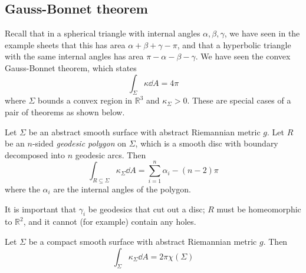 \subsection{Gauss-Bonnet theorem}
Recall that in a spherical triangle with internal angles \( \alpha, \beta, \gamma \), we have seen in the example sheets that this has area \( \alpha + \beta + \gamma - \pi \), and that a hyperbolic triangle with the same internal angles has area \( \pi - \alpha - \beta - \gamma \).
We have seen the convex Gauss-Bonnet theorem, which states
\[
	\int_\Sigma \kappa \dd{A} = 4\pi
\]
where \( \Sigma \) bounds a convex region in \( \mathbb R^3 \) and \( \kappa_\Sigma > 0 \).
These are special cases of a pair of theorems as shown below.
\begin{theorem}
	Let \( \Sigma \) be an abstract smooth surface with abstract Riemannian metric \( g \).
	Let \( R \) be an \( n \)-sided \textit{geodesic polygon} on \( \Sigma \), which is a smooth disc with boundary decomposed into \( n \) geodesic arcs.
	Then
	\[
		\int_{R \subseteq \Sigma} \kappa_\Sigma \dd{A} = \sum_{i=1}^n \alpha_i - (n-2)\pi
	\]
	where the \( \alpha_i \) are the internal angles of the polygon.
\end{theorem}
It is important that \( \gamma_i \) be geodesics that cut out a disc; \( R \) must be homeomorphic to \( \mathbb R^2 \), and it cannot (for example) contain any holes.
\begin{theorem}
	Let \( \Sigma \) be a compact smooth surface with abstract Riemannian metric \( g \).
	Then
	\[
		\int_\Sigma \kappa_\Sigma \dd{A} = 2\pi \chi(\Sigma)
	\]
\end{theorem}
